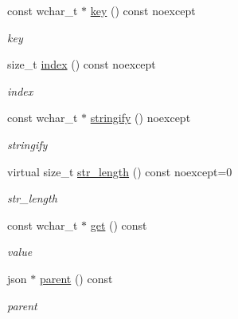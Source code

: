 \begin{DoxyCompactItemize}
const wchar\+\_\+t $\ast$ \hyperlink{classformat_1_1value_ad4865e7984fc9f3b5ce7c17fd7ac740c}{key} () const noexcept
\begin{DoxyCompactList}\small\item\em key \end{DoxyCompactList}\item 
size\+\_\+t \hyperlink{classformat_1_1value_aaa429b28cc0edf5a3589b89a1820ad62}{index} () const noexcept
\begin{DoxyCompactList}\small\item\em index \end{DoxyCompactList}\item 
const wchar\+\_\+t $\ast$ \hyperlink{classformat_1_1value_a7fb73377471f5ed99695846340130348}{stringify} () noexcept
\begin{DoxyCompactList}\small\item\em stringify \end{DoxyCompactList}\item 
virtual size\+\_\+t \hyperlink{classformat_1_1value_a399280e27e629db0582b5781b90ca58b}{str\+\_\+length} () const noexcept=0
\begin{DoxyCompactList}\small\item\em str\+\_\+length \end{DoxyCompactList}\item 
const wchar\+\_\+t $\ast$ \hyperlink{classformat_1_1value_af89058b38ae886a02713b5a556f7fe17}{get} () const 
\begin{DoxyCompactList}\small\item\em value \end{DoxyCompactList}\item 
json $\ast$ \hyperlink{classformat_1_1value_a86c03ec8810bfd0d60ec49095120040d}{parent} () const 
\begin{DoxyCompactList}\small\item\em parent \end{DoxyCompactList}\end{DoxyCompactItemize}

